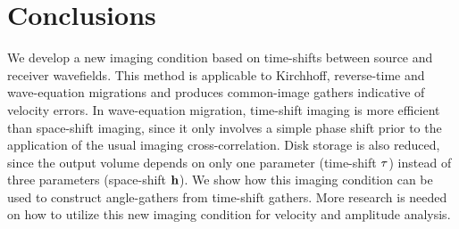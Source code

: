 \section{Conclusions}
We develop a new imaging condition based on time-shifts
between source and receiver wavefields.
This method is applicable to Kirchhoff, reverse-time and
wave-equation migrations and produces common-image gathers 
indicative of velocity errors. 
In wave-equation migration, time-shift imaging is 
more efficient than space-shift imaging, since it only involves
a simple phase shift prior to the application
of the usual imaging cross-correlation. 
Disk storage is also reduced, since the output volume
depends on only one parameter (time-shift $\tt$) instead
of three parameters (space-shift $\hh$).
We show how this imaging condition can be used to 
construct angle-gathers from time-shift gathers.
More research is needed on how to utilize this new imaging condition 
for velocity and amplitude analysis.
